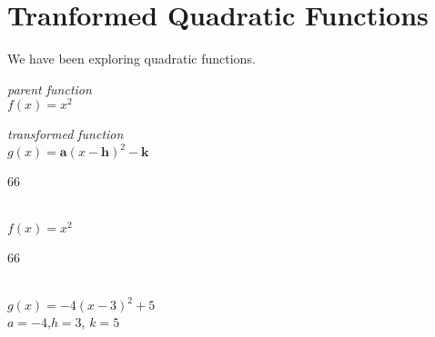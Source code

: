 \section{Tranformed Quadratic Functions}

We have been exploring  quadratic functions.

\begin{tcbraster}[
    raster columns = 2,
    raster equal height,
    raster left skip = 0.75in, raster right skip = 0.75in, raster column skip = 0.75in,
    raster before skip = 0.25in, raster after skip = 0.25in,
]
    \begin{tcolorbox}[]
        \centering
        {\itshape parent function}\\[1\baselineskip]
        \Large
        $ f(x) = x^2 $
    \end{tcolorbox}
    \begin{tcolorbox}[]
        \centering
        {\itshape transformed function}\\[1\baselineskip]
        \Large
        $g(x) = \bm{a}(x-\bm{h})^2 - \bm{k}$
    \end{tcolorbox}
\end{tcbraster}
%

\begin{minipage}{0.5\textwidth}
    \centering
    \begin{myTikzpictureGrid}{0.3} {6}{6}
    \end{myTikzpictureGrid}
    \\
    \large
    $f(x) = x^2$
\end{minipage}
\hfill{}
\begin{minipage}{0.5\textwidth}
    \centering
    \begin{myTikzpictureGrid}{0.3} {6}{6}
    \end{myTikzpictureGrid}
    \\
    \large
    $g(x) = -4(x-3)^2+5$\\ 
    {\small $a = -4$,\quad $h = 3$, \quad $k = 5$}
\end{minipage}


